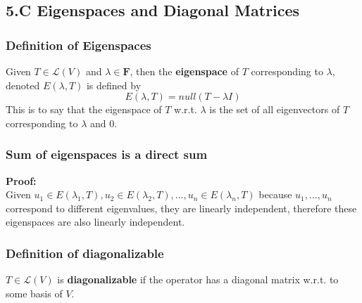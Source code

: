 \documentclass{article}
\begin{document}
\subsection{5.C Eigenspaces and Diagonal Matrices}
\subsubsection{Definition of Eigenspaces}
Given $T \in \mathcal{L}(V)$ and $\lambda \in \mathbf{F}$, then the \textbf{eigenspace} of $T$ corresponding to $\lambda$, denoted $E(\lambda, T)$ is defined by
\begin{equation*}
    E(\lambda, T) = null(T - \lambda I)
\end{equation*}
This is to say that the eigenspace of $T$ w.r.t. $\lambda$ is the set of all eigenvectors of $T$ corresponding to $\lambda$ and $0$.
\subsubsection{Sum of eigenspaces is a direct sum}
\textbf{Proof:}\\
Given $u_1 \in E(\lambda_1, T), u_2 \in E(\lambda_2, T), ..., u_n \in E(\lambda_n, T)$ because $u_1, ..., u_n$ correspond to different eigenvalues, they are linearly independent, therefore these eigenspaces are also linearly independent.
\subsubsection{Definition of diagonalizable}
$T \in \mathcal{L}(V)$ is \textbf{diagonalizable} if the operator has a diagonal matrix w.r.t. to some basis of $V$.
\end{document}
